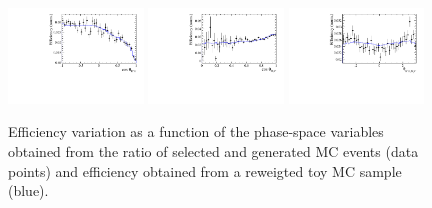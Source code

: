 \begin{figure}[h]
\includegraphics[height=!,width=0.32\textwidth]{figs/AcceptancePhspBDT/eff_cosTheta_Kpi.pdf}
\includegraphics[height=!,width=0.32\textwidth]{figs/AcceptancePhspBDT/eff_cosTheta_Dspi.pdf}
\includegraphics[height=!,width=0.32\textwidth]{figs/AcceptancePhspBDT/eff_phi_Kpi_Dspi.pdf}

\caption{Efficiency variation as a function of the phase-space variables obtained from the ratio of selected and generated MC events (data points) 
and efficiency obtained from a reweigted toy MC sample (blue).
}
\label{fig:PhspBDTeff}
\end{figure}
